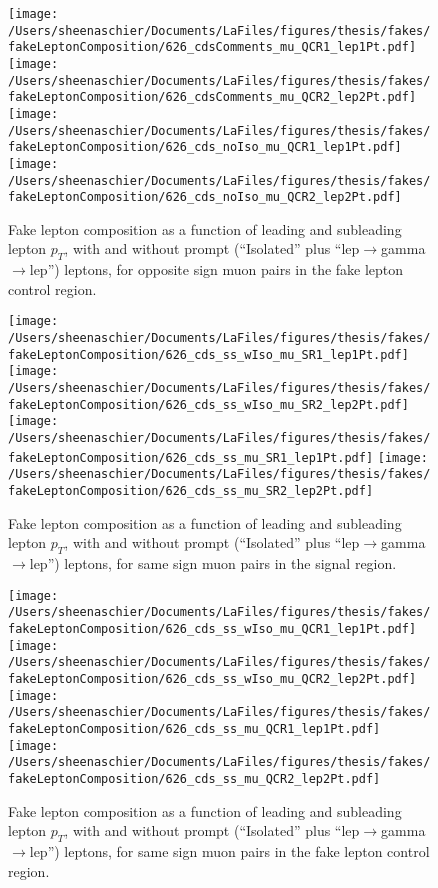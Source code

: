 \begin{figure}[htb]
        \centering
        \texttt{[image: /Users/sheenaschier/Documents/LaFiles/figures/thesis/fakes/fakeLeptonComposition/626\_cdsComments\_mu\_QCR1\_lep1Pt.pdf]}
        \texttt{[image: /Users/sheenaschier/Documents/LaFiles/figures/thesis/fakes/fakeLeptonComposition/626\_cdsComments\_mu\_QCR2\_lep2Pt.pdf]}
        \texttt{[image: /Users/sheenaschier/Documents/LaFiles/figures/thesis/fakes/fakeLeptonComposition/626\_cds\_noIso\_mu\_QCR1\_lep1Pt.pdf]}
        \texttt{[image: /Users/sheenaschier/Documents/LaFiles/figures/thesis/fakes/fakeLeptonComposition/626\_cds\_noIso\_mu\_QCR2\_lep2Pt.pdf]}
        \caption{Fake lepton composition as a function of leading and subleading lepton $p_{T}$, with and without prompt (``Isolated'' plus ``lep$\to$gamma$\to$lep'') leptons, for opposite sign muon pairs in the fake lepton control region.}
        \label{fig:muCR}
\end{figure}
\begin{figure}[htb]
        \centering
        \texttt{[image: /Users/sheenaschier/Documents/LaFiles/figures/thesis/fakes/fakeLeptonComposition/626\_cds\_ss\_wIso\_mu\_SR1\_lep1Pt.pdf]}
        \texttt{[image: /Users/sheenaschier/Documents/LaFiles/figures/thesis/fakes/fakeLeptonComposition/626\_cds\_ss\_wIso\_mu\_SR2\_lep2Pt.pdf]}
        \texttt{[image: /Users/sheenaschier/Documents/LaFiles/figures/thesis/fakes/fakeLeptonComposition/626\_cds\_ss\_mu\_SR1\_lep1Pt.pdf]}
        \texttt{[image: /Users/sheenaschier/Documents/LaFiles/figures/thesis/fakes/fakeLeptonComposition/626\_cds\_ss\_mu\_SR2\_lep2Pt.pdf]}
        \caption{Fake lepton composition as a function of leading and subleading lepton $p_{T}$, with and without prompt (``Isolated'' plus ``lep$\to$gamma$\to$lep'') leptons, for same sign muon pairs in the signal region.}
        \label{fig:muSSSR}
\end{figure}
\begin{figure}[htb]
        \centering
        \texttt{[image: /Users/sheenaschier/Documents/LaFiles/figures/thesis/fakes/fakeLeptonComposition/626\_cds\_ss\_wIso\_mu\_QCR1\_lep1Pt.pdf]}
        \texttt{[image: /Users/sheenaschier/Documents/LaFiles/figures/thesis/fakes/fakeLeptonComposition/626\_cds\_ss\_wIso\_mu\_QCR2\_lep2Pt.pdf]}
        \texttt{[image: /Users/sheenaschier/Documents/LaFiles/figures/thesis/fakes/fakeLeptonComposition/626\_cds\_ss\_mu\_QCR1\_lep1Pt.pdf]}
        \texttt{[image: /Users/sheenaschier/Documents/LaFiles/figures/thesis/fakes/fakeLeptonComposition/626\_cds\_ss\_mu\_QCR2\_lep2Pt.pdf]}
        \caption{Fake lepton composition as a function of leading and subleading lepton $p_{T}$, with and without prompt (``Isolated'' plus ``lep$\to$gamma$\to$lep'') leptons, for same sign muon pairs in the fake lepton control region.}
        \label{fig:muSSCR}

\end{figure}
